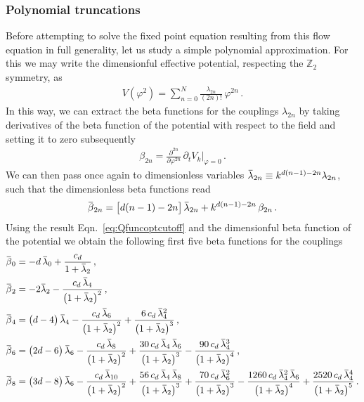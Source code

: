 \documentclass[11pt]{book}
\newcommand{\overbar}[1]{\mkern 1.5mu\overline{\mkern-1.5mu#1\mkern-1.5mu}\mkern 1.5mu}
\numberwithin{equation}{chapter}
\begin{document}
\subsubsection{Polynomial truncations}

Before attempting to solve the fixed point equation resulting from
this flow equation in full generality, let us study a simple polynomial
approximation. For this we may write
the dimensionful effective potential,
respecting the $\mathbb Z_2$ symmetry,
as
\begin{align}
  V(\varphi^2) = \sum_{n=0}^N
  \frac{ \lambda_{2n} }{ (2n)! } \, \varphi^{2n} \,.
\end{align}
In this way, we can extract the beta functions for the
couplings $\lambda_{2n}$ by taking derivatives
of the beta function of the potential
with respect to the field and setting it to zero
subsequently
\begin{align}
  \beta_{2n} = \frac{ \partial^{2n} }{ \partial \varphi^{2n} }
  \, \partial_t V_k \Big|_{\varphi = 0 } \,.
\end{align}
We can then pass once again to dimensionless variables
$\overbar \lambda_{2n} \equiv k^{d(n-1)-2n} \lambda_{2n}$,
such that the dimensionless beta functions read
\begin{align}
  \overbar \beta_{2n} =
  \big[ d(n-1)-2n \big] \, \overbar \lambda_{2n}
  + k^{d(n-1)-2n} \, \beta_{2n} \,.
\end{align}
Using the result Eqn.~\eqref{eq:Qfuncoptcutoff} and the dimensionful
beta function of the potential we obtain the following first
five beta functions for the couplings
\begin{align}
  \overbar \beta_0 &=
  -d \, \overbar \lambda_0 + \frac{ c_d }{ 1 + \overbar \lambda_2 } \,, \\
  \overbar \beta_2 &=
  -2 \overbar \lambda_2 - \frac{ c_d \, \overbar \lambda_4 }{ \big( 1 + \overbar \lambda_2 \big)^2 } \,, \\
  \overbar \beta_4 &=
  \big( d - 4 \big) \, \overbar \lambda_4
  - \frac{ c_d \, \overbar \lambda_6 }{ \big( 1 + \overbar \lambda_2 \big)^2 }
  + \frac{ 6 \, c_d \, \overbar \lambda_4^2 }{ \big( 1 + \overbar \lambda_2 \big)^3 } \,, \\
  \overbar \beta_6 &=
  \big( 2d - 6 \big) \, \overbar \lambda_6
  - \frac{ c_d \, \overbar \lambda_8 }{ \big( 1 + \overbar \lambda_2 \big)^2 }
  + \frac{ 30 \, c_d \, \overbar \lambda_4 \, \overbar \lambda_6 }{ \big( 1 + \overbar \lambda_2 \big)^3 }
  - \frac{ 90 \, c_d \, \overbar \lambda_4^3 }{ \big( 1 + \overbar \lambda_2 \big)^4 } \,, \\
  \overbar \beta_8 &=
  \big( 3d - 8 \big) \, \overbar \lambda_6
  - \frac{ c_d \, \overbar \lambda_{10} }{ \big( 1 + \overbar \lambda_2 \big)^2 }
  + \frac{ 56 \, c_d \, \overbar \lambda_4 \, \overbar \lambda_8 }{ \big( 1 + \overbar \lambda_2 \big)^3 }
  + \frac{ 70 \, c_d \, \overbar \lambda_6^2 }{ \big( 1 + \overbar \lambda_2 \big)^3 }
  - \frac{ 1260 \, c_d \, \overbar \lambda_4^2 \, \overbar \lambda_6 }{ \big( 1 + \overbar \lambda_2 \big)^4 }
  + \frac{ 2520 \, c_d \, \overbar \lambda_4^4 }{ \big( 1 + \overbar \lambda_2 \big)^5 } \,.
\end{align}
\end{document}
